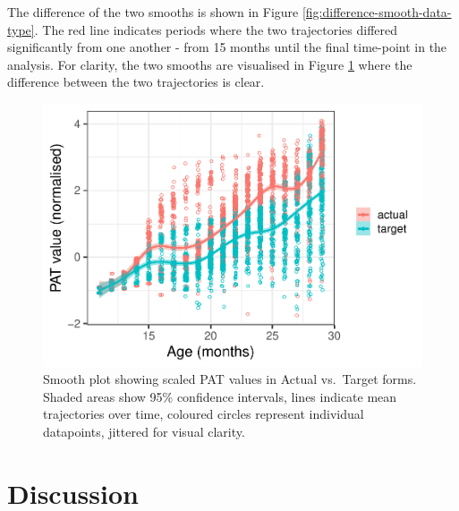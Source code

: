 \documentclass[
  man,mask,floatsintext]{apa6}
\begin{document}
The difference of the two smooths is shown in Figure \ref{fig:difference-smooth-data-type}. The red line indicates periods where the two trajectories differed significantly from one another - from 15 months until the final time-point in the analysis. For clarity, the two smooths are visualised in Figure \ref{fig:plotted-smooth-data-type} where the difference between the two trajectories is clear.

\begin{figure}
\centering
\includegraphics{PhonNetworksProj-anon_files/figure-latex/plotted-smooth-data-type-1.pdf}
\caption{\label{fig:plotted-smooth-data-type}Smooth plot showing scaled PAT values in Actual vs.~Target forms. Shaded areas show 95\% confidence intervals, lines indicate mean trajectories over time, coloured circles represent individual datapoints, jittered for visual clarity.}
\end{figure}

\hypertarget{discussion}{%
\section{Discussion}\label{discussion}}
\end{document}
